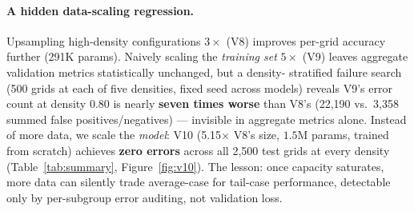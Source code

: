 \documentclass{article}
\begin{document}
\paragraph{A hidden data-scaling regression.} Upsampling high-density
configurations $3\times$ (V8) improves per-grid accuracy further (291K
params). Naively scaling the \emph{training set} $5\times$ (V9) leaves
aggregate validation metrics statistically unchanged, but a density-
stratified failure search (500 grids at each of five densities, fixed seed
across models) reveals V9's error count at density 0.80 is nearly
\textbf{seven times worse} than V8's (22{,}190 vs.\ 3{,}358 summed
false positives/negatives) --- invisible in aggregate metrics alone.
Instead of more data, we scale the \emph{model}: V10 (5.15$\times$ V8's
size, $1.5$M params, trained from scratch) achieves \textbf{zero errors}
across all 2{,}500 test grids at every density (Table~\ref{tab:summary},
Figure~\ref{fig:v10}). The lesson: once capacity saturates, more data can
silently trade average-case for tail-case performance, detectable only by
per-subgroup error auditing, not validation loss.
\end{document}
